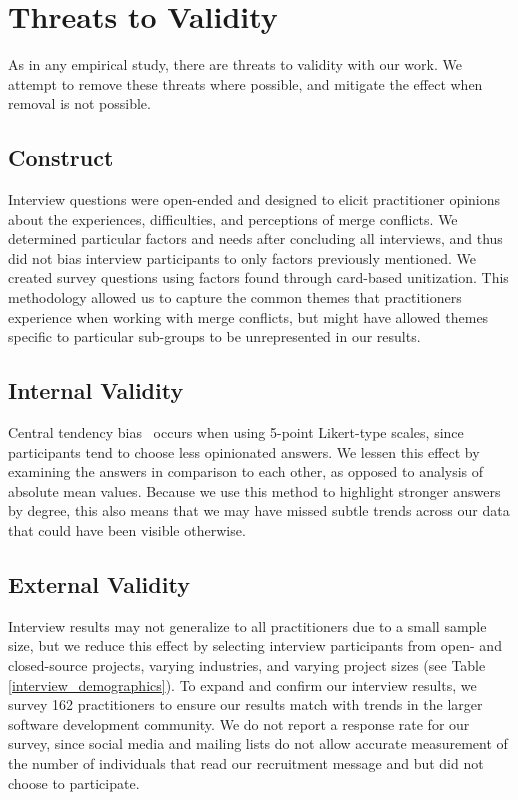 \section{Threats to Validity}\label{threats}
As in any empirical study, there are threats to validity with our work.
We attempt to remove these threats where possible, and mitigate the effect when removal is not possible.

\subsection{Construct}
Interview questions were open-ended and designed to elicit practitioner opinions about the experiences, difficulties, and perceptions of merge conflicts.
We determined particular factors and needs after concluding all interviews, and thus did not bias interview participants to only factors previously mentioned.
We created survey questions using factors found through card-based unitization.
This methodology allowed us to capture the common themes that practitioners experience when working with merge conflicts, but might have allowed themes specific to particular sub-groups to be unrepresented in our results.

\subsection{Internal Validity}
Central tendency bias~\cite{guilford1954psychometric} occurs when using 5-point Likert-type scales, since participants tend to choose less opinionated answers.
We lessen this effect by examining the answers in comparison to each other, as opposed to analysis of absolute mean values.
Because we use this method to highlight stronger answers by degree, this also means that we may have missed subtle trends across our data that could have been visible otherwise.

\subsection{External Validity}
Interview results may not generalize to all practitioners due to a small sample size, but we reduce this effect by selecting interview participants from open- and closed-source projects, varying industries, and varying project sizes (see Table \ref{interview_demographics}).
To expand and confirm our interview results, we survey 162 practitioners to ensure our results match with trends in the larger software development community.
We do not report a response rate for our survey, since social media and mailing lists do not allow accurate measurement of the number of individuals that read our recruitment message and but did not choose to participate.




